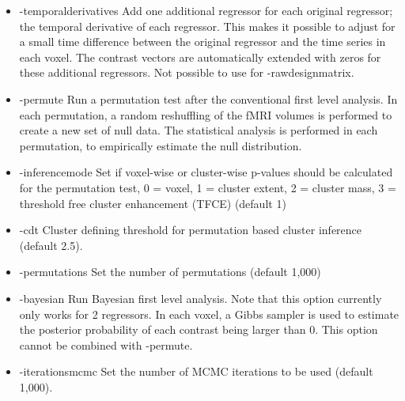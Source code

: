 \begin{itemize}
\item -temporalderivatives 
\newline \newline Add one additional regressor for each original regressor; the temporal derivative of each regressor. This makes it possible to adjust for a small time difference between the original regressor and the time series in each voxel. The contrast vectors are automatically extended with zeros for these additional regressors. Not possible to use for -rawdesignmatrix.

\item -permute
\newline \newline Run a permutation test after the conventional first level analysis. In each permutation, a random reshuffling of the fMRI volumes is performed to create a new set of null data. The statistical analysis is performed in each permutation, to empirically estimate the null distribution. 

\item -inferencemode 
\newline \newline Set if voxel-wise or cluster-wise p-values should be calculated for the permutation test, 0 = voxel, 1 = cluster extent, 2 = cluster mass, 3 = threshold free cluster enhancement (TFCE) (default 1)

\item -cdt 
\newline \newline Cluster defining threshold for permutation based cluster inference (default 2.5). 

\item -permutations 
\newline \newline Set the number of permutations (default 1,000)

\item -bayesian 
\newline \newline Run Bayesian first level analysis.  Note that this option currently only works for 2 regressors. In each voxel, a Gibbs sampler is used to estimate the posterior probability of each contrast being larger than 0. This option cannot be combined with -permute.

\item -iterationsmcmc 
\newline \newline Set the number of MCMC iterations to be used (default 1,000).

\end{itemize}

